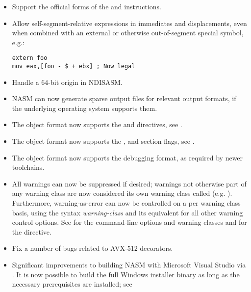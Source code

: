 \begin{itemize}
    \item{Support the official forms of the  and  instructions.}

    \item{Allow self-segment-relative expressions in immediates and
        displacements, even when combined with an external or otherwise
        out-of-segment special symbol, e.g.:
\begin{lstlisting}
extern foo
mov eax,[foo - $ + ebx] ; Now legal
\end{lstlisting}}

    \item{Handle a 64-bit origin in NDISASM.}

    \item{NASM can now generate sparse output files for relevant output
        formats, if the underlying operating system supports them.}

    \item{The  object format now supports the
         and 
        directives, see .}

    \item{The  object format now supports the ,
         and  section flags,
        see .}

    \item{The  object format now supports the  debugging
        format, as required by newer toolchains.}

    \item{All warnings can now be suppressed if desired; warnings not
        otherwise part of any warning class are now considered its own
        warning class called  (e.g. ). Furthermore,
        warning-as-error can now be controlled on a per warning class
        basis, using the syntax \emph{warning-class} and its
        equivalent for all other warning control options. See 
        for the command-line options and warning classes and
         for the \code{[WARNING]} directive.}

    \item{Fix a number of bugs related to AVX-512 decorators.}

    \item{Significant improvements to building NASM with Microsoft Visual
        Studio via . It is now possible to build the
        full Windows installer binary as long as the necessary
        prerequisites are installed; see }


\end{itemize}
